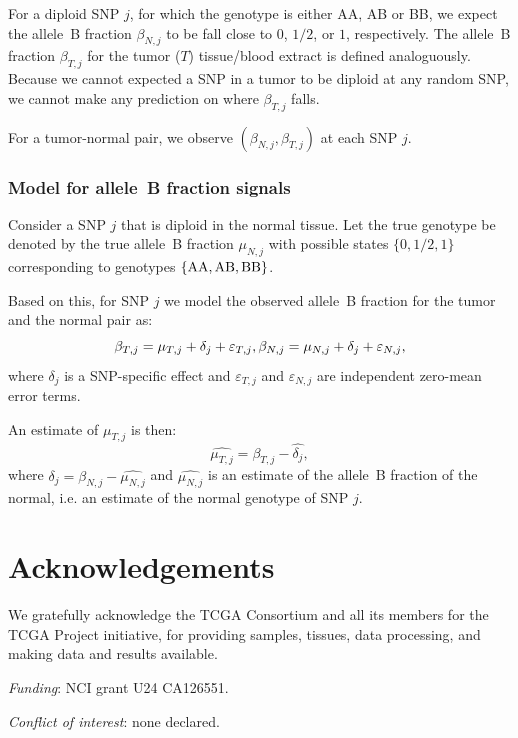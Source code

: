 \documentclass[]{bioinfo}
\newcommand{\gAA}{\textnormal{AA}\xspace}
\newcommand{\gAB}{\textnormal{AB}\xspace}
\newcommand{\gBB}{\textnormal{BB}\xspace}
\newcommand{\eps}{\varepsilon\xspace}
\begin{document}
For a diploid SNP $j$, for which the genotype is either AA, AB or BB, we expect the allele~B fraction $\beta_{N,j}$ to be fall close to $0$, $1/2$, or $1$, respectively.
The allele~B fraction $\beta_{T,j}$ for the tumor ($T$) tissue/blood extract is defined analoguously. Because we cannot expected a SNP in a tumor to be diploid at any random SNP, we cannot make any prediction on where $\beta_{T,j}$ falls.

For a tumor-normal pair, we observe $(\beta_{N,j}, \beta_{T,j})$ at each SNP $j$.

\subsubsection{Model for allele~B fraction signals}
Consider a SNP $j$ that is diploid in the normal tissue.  
Let the true genotype be denoted by the true allele~B fraction $\mu_{N,j}$ with possible states $\{0,1/2,1\}$ corresponding to genotypes $\{\gAA,\gAB,\gBB\}$.

Based on this, for SNP $j$ we model the observed allele~B fraction for the tumor and the normal pair as:
\begin{equation}
  \beta_{T,j} = \mu_{T,j} + \delta_{j} + \eps_{T,j},\\
  \beta_{N,j} = \mu_{N,j} + \delta_{j} + \eps_{N,j},
  \label{eqnFracBModel}
\end{equation}
where $\delta_{j}$ is a SNP-specific effect and $\eps_{T,j}$ and $\eps_{N,j}$ are independent zero-mean error terms.

An estimate of $\mu_{T,j}$ is then:
\begin{equation}
  \hat{\mu_{T,j}} = \beta_{T,j} - \hat{\delta_{j}},
  \label{eqnTumorBoostEstimate}
\end{equation}
where $\hat{\delta_{j}} = \beta_{N,j} - \hat{\mu_{N,j}}$ and $\hat{\mu_{N,j}}$ is an estimate of the allele~B fraction of the normal, i.e. an estimate of the normal genotype of SNP $j$.



\section*{Acknowledgements}
We gratefully acknowledge the TCGA Consortium and all its members for the TCGA Project initiative, for providing samples, tissues, data processing, and making data and results available.

\emph{Funding}: NCI grant U24 CA126551.

\emph{Conflict of interest}: none declared.


\begin{methods}


\end{methods}
 
\end{document}
